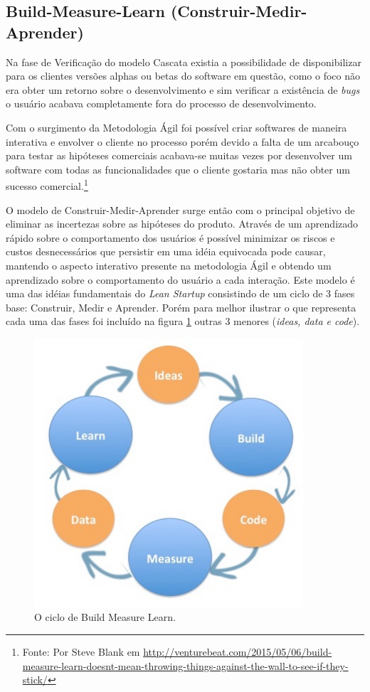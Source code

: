 \subsection{Build-Measure-Learn (Construir-Medir-Aprender)}
\par Na fase de Verificação do modelo Cascata existia a possibilidade de disponibilizar para os clientes versões alphas ou betas do software em questão, como o foco não era obter um retorno sobre o desenvolvimento e sim verificar a existência de \emph{bugs} o usuário acabava completamente fora do processo de desenvolvimento.
\par Com o surgimento da Metodologia Ágil foi possível criar softwares de maneira interativa e envolver o cliente no processo porém devido a falta de um arcabouço para testar as hipóteses comerciais acabava-se muitas vezes por desenvolver um software com todas as funcionalidades que o cliente gostaria mas não obter um sucesso comercial.\footnote{Fonte: Por Steve Blank em \url{http://venturebeat.com/2015/05/06/build-measure-learn-doesnt-mean-throwing-things-against-the-wall-to-see-if-they-stick/}}
\par O modelo de Construir-Medir-Aprender surge então com o principal objetivo de eliminar as incertezas sobre as hipóteses do produto. Através de um aprendizado rápido sobre o comportamento dos usuários é possível minimizar os riscos e custos desnecessários que persistir em uma idéia equivocada pode causar, mantendo o aspecto interativo presente na metodologia Ágil e obtendo um aprendizado sobre o comportamento do usuário a cada interação. Este modelo é uma das idéias fundamentais do \emph{Lean Startup} consistindo de um ciclo de 3 fases base: Construir, Medir e Aprender. Porém para melhor ilustrar o que representa cada uma das fases foi incluído na figura \ref{fig:buildmeasurelearn} outras 3 menores (\emph{ideas, data e code}).
\begin{figure}[htb]
\centering
\includegraphics[width=10cm]{figuras/buildmeasurelearn}
\caption{\label{fig:buildmeasurelearn}O ciclo de Build Measure Learn.}
\end{figure}
